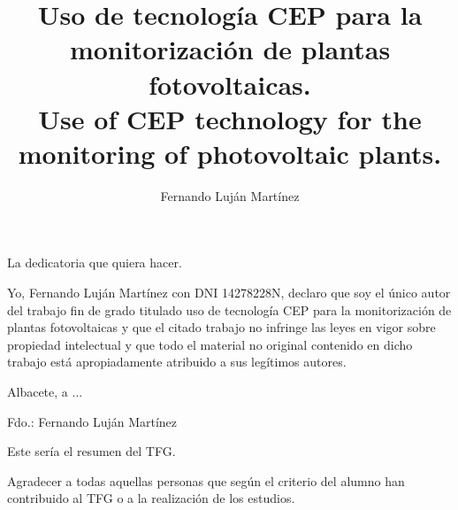 \documentclass[spanish,twoside,openright,12pt,a4paper]{book}
\title{Uso de tecnología CEP para la monitorización de plantas fotovoltaicas. \\ Use of CEP technology for the monitoring of photovoltaic plants.}
\author{Fernando Luján Martínez}
\begin{document}
\renewcommand\tablename{Tabla}
\renewcommand\listtablename{ÍNDICE DE TABLAS}

\renewcommand\listfigurename{ÍNDICE DE FIGURAS}

\cosupervisor{}

\maketitle

\frontmatter %

\begin{dedicatoria} %
La dedicatoria que quiera hacer.
\end{dedicatoria}


\begin{autoria}

Yo, Fernando Luján Martínez con DNI 14278228N, declaro que soy el único autor del trabajo fin de grado titulado uso de tecnología CEP para la monitorización de plantas fotovoltaicas y que el citado trabajo no infringe las leyes en vigor sobre propiedad intelectual y que todo el material no original contenido en dicho trabajo está apropiadamente atribuido a sus legítimos autores.

\vspace*{2cm}

Albacete, a ...

\vspace*{2cm}

Fdo.: Fernando Luján Martínez

\end{autoria}



\begin{resumen} %
Este sería el resumen del TFG.
\end{resumen}

\begin{agradece} %
Agradecer a todas aquellas personas que según el criterio del alumno han contribuido al TFG o a la realización de los estudios.
\end{agradece}


\tableofcontents

\clearpage
\listoffigures
{} 
\clearpage
\listoftables
{} 
\thispagestyle{empty}\cleardoublepage
\end{document}
